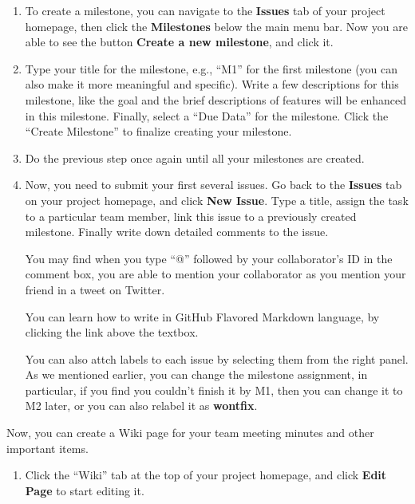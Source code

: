 \begin{enumerate}

\item To create a milestone, you can navigate to the \textbf{Issues} tab of your
project homepage, then click the \textbf{Milestones} below the main menu bar.
Now you are able to see the button \textbf{Create a new milestone}, and click it.

\item Type your title for the milestone, e.g., ``M1'' for the first milestone
(you can also make it more meaningful and specific). Write a few descriptions
for this milestone, like the goal and the brief descriptions of features will be
enhanced in this milestone. Finally, select a ``Due Data'' for the milestone.
Click the ``Create Milestone'' to finalize creating your milestone.

\item Do the previous step once again until all your milestones are created.

\item Now, you need to submit your first several issues. Go back to the
\textbf{Issues} tab on your project homepage, and click \textbf{New Issue}. Type
a title, assign the task to a particular team member, link this issue to a
previously created milestone. Finally write down detailed comments to the issue.

You may find when you type ``@'' followed by your collaborator's ID in the
comment box, you are able to mention your collaborator as you mention your
friend in a tweet on Twitter.

You can learn how to write in GitHub Flavored Markdown language, by clicking the
link above the textbox.

You can also attch labels to each issue by selecting them from the right panel.
As we mentioned earlier, you can change the milestone assignment, in particular,
if you find you couldn't finish it by M1, then you can change it to M2 later, or
you can also relabel it as \textbf{wontfix}.

\end{enumerate}

Now, you can create a Wiki page for your team meeting minutes and other
important items.

\begin{enumerate}

\item Click the ``Wiki'' tab at the top of your project homepage, and click
\textbf{Edit Page} to start editing it.

\end{enumerate}

